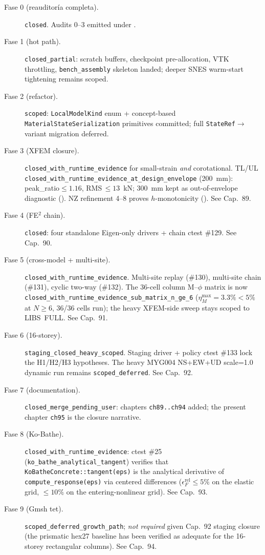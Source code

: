 \begin{description}
  \item[Fase 0 (reauditoría completa).] \texttt{closed}.
        Audits 0--3 emitted under
        .
  \item[Fase 1 (hot path).] \texttt{closed\_partial}: scratch buffers,
        checkpoint pre-allocation, VTK throttling,
        \texttt{bench\_assembly} skeleton landed; deeper SNES
        warm-start tightening remains scoped.
  \item[Fase 2 (refactor).] \texttt{scoped}:
        \texttt{LocalModelKind} enum + concept-based
        \texttt{MaterialStateSerialization} primitives committed;
        full \texttt{StateRef}\(\to\)variant migration deferred.
  \item[Fase 3 (XFEM closure).] \texttt{closed\_with\_runtime\_evidence}
        for small-strain \emph{and} corotational. TL/UL
        \texttt{closed\_with\_runtime\_evidence\_at\_design\_envelope}
        (200~mm): peak\_ratio$\le 1.16$, RMS\,$\le 13$~kN; 300~mm
        kept as out-of-envelope diagnostic
        ().
        NZ refinement 4--8 proves \(h\)-monotonicity
        (). See Cap.~89.
  \item[Fase 4 (FE\(^2\) chain).] \texttt{closed}: four standalone
        Eigen-only drivers + chain ctest \#129. See Cap.~90.
  \item[Fase 5 (cross-model + multi-site).]
        \texttt{closed\_with\_runtime\_evidence}. Multi-site
        replay (\#130), multi-site chain (\#131), cyclic two-way
        (\#132). The 36-cell column M--\(\phi\) matrix is now
        \texttt{closed\_with\_runtime\_evidence\_sub\_matrix\_n\_ge\_6}
        ($\eta_M^{\max}=3.3\%<5\%$ at $N\ge 6$, 36/36 cells run);
        the heavy XFEM-side sweep stays scoped to LIBS~FULL.
        See Cap.~91.
  \item[Fase 6 (16-storey).] \texttt{staging\_closed\_heavy\_scoped}.
        Staging driver + policy ctest \#133 lock the H1/H2/H3
        hypotheses. The heavy MYG004 NS+EW+UD scale=1.0 dynamic
        run remains \texttt{scoped\_deferred}. See Cap.~92.
  \item[Fase 7 (documentation).]
        \texttt{closed\_merge\_pending\_user}: chapters
        \texttt{ch89..ch94} added; the present chapter \texttt{ch95}
        is the closure narrative.
  \item[Fase 8 (Ko-Bathe).]
        \texttt{closed\_with\_runtime\_evidence}: ctest \#25
        (\texttt{ko\_bathe\_analytical\_tangent}) verifies that
        \texttt{KoBatheConcrete::tangent(eps)} is the analytical
        derivative of \texttt{compute\_response(eps)} via centered
        differences ($\epsilon^{\mathrm{rel}}_F\le 5\%$ on the
        elastic grid, $\le 10\%$ on the entering-nonlinear grid).
        See Cap.~93.
  \item[Fase 9 (Gmsh tet).] \texttt{scoped\_deferred\_growth\_path};
        \emph{not required} given Cap.~92 staging closure (the
        prismatic hex27 baseline has been verified as adequate for
        the 16-storey rectangular columns). See Cap.~94.
\end{description}

